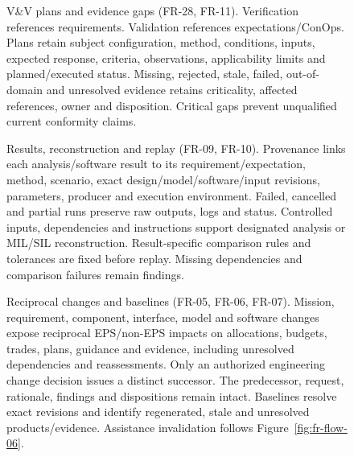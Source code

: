 \begin{figure}[H]
\centering
{}
\caption[V\&V plans and evidence gaps.]{V\&V plans and evidence gaps (FR-28, FR-11). Verification references requirements. Validation references expectations/ConOps. Plans retain subject configuration, method, conditions, inputs, expected response, criteria, observations, applicability limits and planned/executed status. Missing, rejected, stale, failed, out-of-domain and unresolved evidence retains criticality, affected references, owner and disposition. Critical gaps prevent unqualified current conformity claims.}
\label{fig:fr-flow-20}
\end{figure}
\clearpage

\begin{figure}[H]
\centering
{}
\caption[Results, reconstruction and replay.]{Results, reconstruction and replay (FR-09, FR-10). Provenance links each analysis/software result to its requirement/expectation, method, scenario, exact design/model/software/input revisions, parameters, producer and execution environment. Failed, cancelled and partial runs preserve raw outputs, logs and status. Controlled inputs, dependencies and instructions support designated analysis or MIL/SIL reconstruction. Result-specific comparison rules and tolerances are fixed before replay. Missing dependencies and comparison failures remain findings.}
\label{fig:fr-flow-21}
\end{figure}
\clearpage

\begin{figure}[H]
\centering
{}
\caption[Reciprocal changes and baselines.]{Reciprocal changes and baselines (FR-05, FR-06, FR-07). Mission, requirement, component, interface, model and software changes expose reciprocal EPS/non-EPS impacts on allocations, budgets, trades, plans, guidance and evidence, including unresolved dependencies and reassessments. Only an authorized engineering change decision issues a distinct successor. The predecessor, request, rationale, findings and dispositions remain intact. Baselines resolve exact revisions and identify regenerated, stale and unresolved products/evidence. Assistance invalidation follows Figure~\ref{fig:fr-flow-06}.}
\label{fig:fr-flow-22}
\end{figure}
\clearpage

